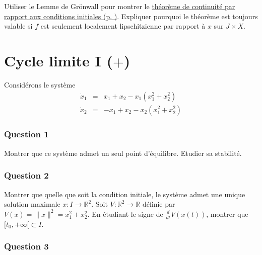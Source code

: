 
Utiliser le Lemme de Grönwall pour montrer le
\protect\hyperlink{theo_reg_CI}{théorème de continuité par rapport aux
conditions initiales (p. \pageref*{theo_reg_CI})}. Expliquer pourquoi le
théorème est toujours valable si \(f\) est seulement localement
lipschitzienne par rapport à \(x\) sur \(J\times X\).

\hypertarget{exo_cycle-lim}{%
\section{\texorpdfstring{Cycle limite I
(\(+\))}{Cycle limite I (+)}}\label{exo_cycle-lim}}

Considérons le système \[
\begin{array}{rcl}
\dot{x}_1 &=& x_1+x_2-x_1(x_1^2 + x_2^2)\\
\dot{x}_2 &=& -x_1+x_2-x_2(x_1^2 + x_2^2)
\end{array}
\]

\hypertarget{cycle-lim-1}{%
\subsubsection*{Question 1}\label{cycle-lim-1}}


Montrer que ce système admet un seul point d'équilibre. Etudier sa
stabilité.

\hypertarget{cycle-lim-2}{%
\subsubsection*{Question 2}\label{cycle-lim-2}}


Montrer que quelle que soit la condition initiale, le système admet une
unique solution maximale \(x:I\to \mathbb{R}^2\). Soit
\(V:\mathbb{R}^2\to\mathbb{R}\) définie par
\(V(x) = \|x\|^2 = x_1^2+x_2^2\). En étudiant le signe de
\(\frac{d}{dt}V(x(t))\), montrer que \([t_0,+\infty[ \subset I\).

\hypertarget{cycle-lim-3}{%
\subsubsection*{Question 3}\label{cycle-lim-3}}

